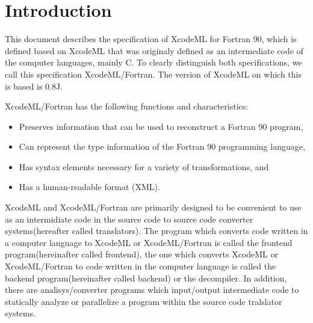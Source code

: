 \section{Introduction}


This document describes the specification of XcodeML for Fortran 90, which is defined based on XcodeML that was originaly defined as an intermediate code of the computer languages, mainly C. To clearly distinguish both specifications, we call this specification XcodeML/Fortran. The version of XcodeML on which this is based is 0.8J.


XcodeML/Fortran has the following functions and characteristics:

\begin{itemize}
\item Preserves information that can be used to reconstruct a Fortran 90 program,
\item Can represent the type information of the Fortran 90 programming language,
\item Has syntax elements necessary for a variety of transformations, and
\item Has a human-readable format (XML).
\end{itemize}

XcodeML and XcodeML/Fortran are primarily designed to be convenient to use as an intermidiate code in the source code to source code converter systems(hereafter called translators). The program which converts code written in a computer language to XcodeML or XcodeML/Fortran is called the frontend program(hereinafter called frontend), the one which converts XcodeML or XcodeML/Fortran to code written in the computer language is called the backend program(hereinafter called backend) or the decompiler. In addition, there are analisys/converter programs which input/output intermediate code to statically analyze or parallelize a program within the source code tralslator systems.
